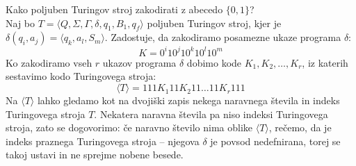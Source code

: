\documentclass[10pt,a4paper,oneside]{book}
\begin{document}
Kako poljuben Turingov stroj zakodirati z abecedo $\{0,1\}$?\\
Naj bo $T=\langle Q,\Sigma,\Gamma,\delta,q_1,B_1,q_f \rangle$ poljuben Turingov stroj, kjer je $\delta(q_i,a_j)=\langle q_k, a_l, S_m \rangle$.%
\br
Zadostuje, da zakodiramo posamezne ukaze programa $\delta$:
	\[ K=0^i 1 0^j 1 0^k 1 0^l 1 0^m\]
Ko zakodiramo vseh $r$ ukazov programa $\delta$ dobimo kode $K_1, K_2, \dots, K_r$, iz katerih sestavimo kodo Turingovega stroja:
	\[ \langle T \rangle = 111 K_1 11 K_2 11 \dots 11 K_r 111\]%
Na $\langle T \rangle$ lahko gledamo kot na dvojiški zapis nekega naravnega števila in indeks Turingovega stroja $T$. Nekatera naravna števila pa niso indeksi Turingovega stroja, zato se dogovorimo: če naravno število nima oblike $\langle T \rangle$, rečemo, da je indeks praznega Turingovega stroja -- njegova $\delta$ je povsod nedefnirana, torej se takoj ustavi in ne sprejme nobene besede.
\end{document}
